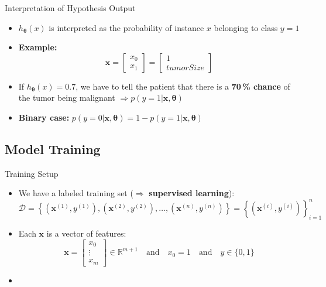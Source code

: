 \begin{frame}{Interpretation of Hypothesis Output}{}
	\begin{itemize}
		\item $h_{\bm{\theta}}(x)$ is interpreted as the probability of instance $x$ belonging to class $y = 1$
		\item \textbf{Example:}
		\begin{equation}
			\bm{x} = \begin{bmatrix} x_0 \\ x_1 \end{bmatrix} = \begin{bmatrix} 1 \\ tumorSize \end{bmatrix}
		\end{equation}
		\vspace*{1mm}
		\item If $h_{\bm{\theta}}(x) = 0.7$, we have to tell the patient that there
			is a \textbf{70\,\% chance} of the tumor being malignant $\Rightarrow p(y = 1 \vert \bm{x}, \bm{\theta})$
		\item \textbf{Binary case:} $p(y = 0 \vert \bm{x}, \bm{\theta}) = 1 - p(y = 1 \vert \bm{x}, \bm{\theta})$
	\end{itemize}
\end{frame}


\subsection{Model Training}

\begin{frame}{Training Setup}{}
	\begin{itemize}
		\item We have a labeled training set ($\Rightarrow$ \textbf{supervised learning}):
		\begin{equation}
			\mathcal{D} = 
				\left\{ (\bm{x}^{(1)}, y^{(1)}), (\bm{x}^{(2)}, y^{(2)}), \dots, (\bm{x}^{(n)}, y^{(n)}) \right\}
				= \left\{ (\bm{x}^{(i)}, y^{(i)}) \right\}_{i=1}^n
		\end{equation}
		\item Each $\bm{x}$ is a vector of features:
		\begin{equation}
			\bm{x} = \begin{bmatrix} x_0 \\ \vdots \\ x_{m} \end{bmatrix} \in \mathbb{R}^{m+1}
			\quad \text{and} \quad x_0 = 1 \quad \text{and} \quad y \in \{0, 1\}
		\end{equation}
		\item {}
	\end{itemize}
\end{frame}



